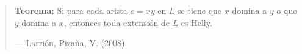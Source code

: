 \documentclass[beamer]{standalone}
\begin{document}
\begin{standaloneframe}
  \begin{quote}
    \textbf{Teorema:}
    Si para cada arista $e=xy$ en $L$ se tiene
    que $x$ domina a $y$ o que $y$ domina a $x$, entonces toda extensión
    de $L$ es Helly.

    \hfill--- \color{purple} Larrión, Pizaña, V. (2008)
  \end{quote}
\end{standaloneframe}
\end{document}
